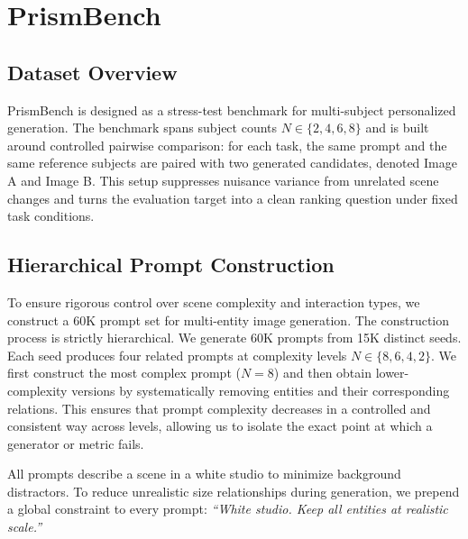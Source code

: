 \section{PrismBench}

\subsection{Dataset Overview}
PrismBench is designed as a stress-test benchmark for multi-subject personalized generation. The benchmark spans subject counts $N \in \{2,4,6,8\}$ and is built around controlled pairwise comparison: for each task, the same prompt and the same reference subjects are paired with two generated candidates, denoted Image A and Image B. This setup suppresses nuisance variance from unrelated scene changes and turns the evaluation target into a clean ranking question under fixed task conditions.

\subsection{Hierarchical Prompt Construction}
To ensure rigorous control over scene complexity and interaction types, we construct a 60K prompt set for multi-entity image generation. The construction process is strictly hierarchical. We generate 60K prompts from 15K distinct seeds. Each seed produces four related prompts at complexity levels $N \in \{8, 6, 4, 2\}$. We first construct the most complex prompt ($N=8$) and then obtain lower-complexity versions by systematically removing entities and their corresponding relations. This ensures that prompt complexity decreases in a controlled and consistent way across levels, allowing us to isolate the exact point at which a generator or metric fails.

All prompts describe a scene in a white studio to minimize background distractors. To reduce unrealistic size relationships during generation, we prepend a global constraint to every prompt: \textit{``White studio. Keep all entities at realistic scale.''}

